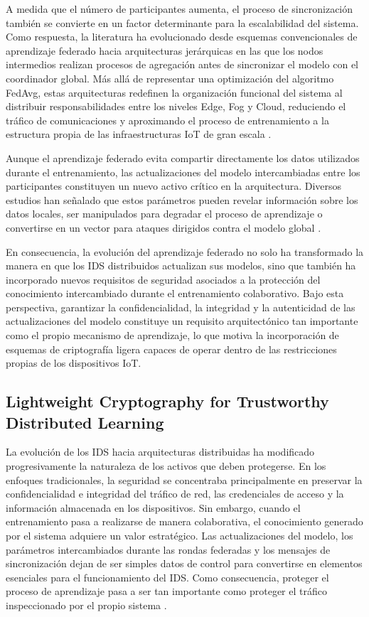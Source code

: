 \documentclass[journal,article,submit,moreauthors]{Definitions/mdpi}
\begin{document}
A medida que el número de participantes aumenta, el proceso de sincronización también se convierte en un factor determinante para la escalabilidad del sistema. Como respuesta, la literatura ha evolucionado desde esquemas convencionales de aprendizaje federado hacia arquitecturas jerárquicas en las que los nodos intermedios realizan procesos de agregación antes de sincronizar el modelo con el coordinador global. Más allá de representar una optimización del algoritmo FedAvg, estas arquitecturas redefinen la organización funcional del sistema al distribuir responsabilidades entre los niveles Edge, Fog y Cloud, reduciendo el tráfico de comunicaciones y aproximando el proceso de entrenamiento a la estructura propia de las infraestructuras IoT de gran escala \cite{Ficco2024,Tran2026,Ramadan2025,Ma2024,Cooray2025}.

Aunque el aprendizaje federado evita compartir directamente los datos utilizados durante el entrenamiento, las actualizaciones del modelo intercambiadas entre los participantes constituyen un nuevo activo crítico en la arquitectura. Diversos estudios han señalado que estos parámetros pueden revelar información sobre los datos locales, ser manipulados para degradar el proceso de aprendizaje o convertirse en un vector para ataques dirigidos contra el modelo global \cite{Imteaj2022,Hajj2023,Bunko2026}.

En consecuencia, la evolución del aprendizaje federado no solo ha transformado la manera en que los IDS distribuidos actualizan sus modelos, sino que también ha incorporado nuevos requisitos de seguridad asociados a la protección del conocimiento intercambiado durante el entrenamiento colaborativo. Bajo esta perspectiva, garantizar la confidencialidad, la integridad y la autenticidad de las actualizaciones del modelo constituye un requisito arquitectónico tan importante como el propio mecanismo de aprendizaje, lo que motiva la incorporación de esquemas de criptografía ligera capaces de operar dentro de las restricciones propias de los dispositivos IoT.

\subsection{Lightweight Cryptography for Trustworthy Distributed Learning}
La evolución de los IDS hacia arquitecturas distribuidas ha modificado progresivamente la naturaleza de los activos que deben protegerse. En los enfoques tradicionales, la seguridad se concentraba principalmente en preservar la confidencialidad e integridad del tráfico de red, las credenciales de acceso y la información almacenada en los dispositivos. Sin embargo, cuando el entrenamiento pasa a realizarse de manera colaborativa, el conocimiento generado por el sistema adquiere un valor estratégico. Las actualizaciones del modelo, los parámetros intercambiados durante las rondas federadas y los mensajes de sincronización dejan de ser simples datos de control para convertirse en elementos esenciales para el funcionamiento del IDS. Como consecuencia, proteger el proceso de aprendizaje pasa a ser tan importante como proteger el tráfico inspeccionado por el propio sistema \cite{Bunko2026,Alshammari2026}.
\end{document}
